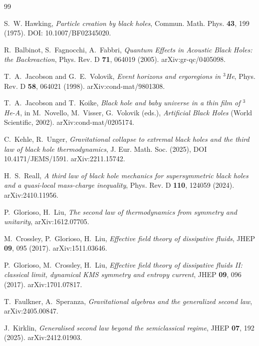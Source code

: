 \documentclass[prd,aps,twocolumn,floatfix,nofootinbib,superscriptaddress]{revtex4-2}
\begin{document}
\begin{thebibliography}{99}

S.~W. Hawking,
\textit{Particle creation by black holes},
Commun. Math. Phys. \textbf{43}, 199 (1975).
DOI: 10.1007/BF02345020.

R.~Balbinot, S.~Fagnocchi, A.~Fabbri,
\textit{Quantum Effects in Acoustic Black Holes: the Backreaction},
Phys. Rev. D \textbf{71}, 064019 (2005). arXiv:gr-qc/0405098.

T.~A.~Jacobson and G.~E.~Volovik,
\textit{Event horizons and ergoregions in $^3$He},
Phys. Rev. D \textbf{58}, 064021 (1998). arXiv:cond-mat/9801308.

T.~A.~Jacobson and T.~Koike,
\textit{Black hole and baby universe in a thin film of $^3$He-A},
in M.~Novello, M.~Visser, G.~Volovik (eds.), \textit{Artificial Black
Holes} (World Scientific, 2002). arXiv:cond-mat/0205174.


C.~Kehle, R.~Unger,
\textit{Gravitational collapse to extremal black holes and the
third law of black hole thermodynamics},
J. Eur. Math. Soc. (2025), DOI 10.4171/JEMS/1591. arXiv:2211.15742.

H.~S.~Reall,
\textit{A third law of black hole mechanics for supersymmetric black
holes and a quasi-local mass-charge inequality},
Phys. Rev. D \textbf{110}, 124059 (2024). arXiv:2410.11956.

P.~Glorioso, H.~Liu,
\textit{The second law of thermodynamics from symmetry and unitarity},
arXiv:1612.07705.

M.~Crossley, P.~Glorioso, H.~Liu,
\textit{Effective field theory of dissipative fluids},
JHEP \textbf{09}, 095 (2017). arXiv:1511.03646.

P.~Glorioso, M.~Crossley, H.~Liu,
\textit{Effective field theory of dissipative fluids II:
classical limit, dynamical KMS symmetry and entropy current},
JHEP \textbf{09}, 096 (2017). arXiv:1701.07817.


T.~Faulkner, A.~Speranza,
\textit{Gravitational algebras and the generalized second law},
arXiv:2405.00847.

J.~Kirklin,
\textit{Generalised second law beyond the semiclassical regime},
JHEP \textbf{07}, 192 (2025). arXiv:2412.01903.


\end{thebibliography}
\end{document}
